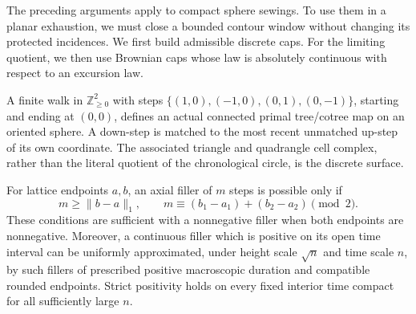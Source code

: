 The preceding arguments apply to compact sphere sewings. To use them
in a planar exhaustion, we must close a bounded contour window without
changing its protected incidences. We first build admissible discrete
caps. For the limiting quotient, we then use Brownian caps whose law
is absolutely continuous with respect to an excursion law.

\begin{lemma}
\label{bg:axial-completion}
A finite walk in $\mathbb Z_{\ge0}^2$ with steps
$\{(1,0),(-1,0),(0,1),(0,-1)\}$, starting and ending at $(0,0)$,
defines an actual connected primal tree/cotree map on an oriented
sphere. A down-step is matched to the most recent unmatched up-step
of its own coordinate. The associated triangle and quadrangle cell
complex, rather than the literal quotient of the chronological
circle, is the discrete surface.

For lattice endpoints $a,b$, an axial filler of $m$ steps is possible
only if
\[
 m\ge \lVert b-a\rVert_1,
 \qquad m\equiv(b_1-a_1)+(b_2-a_2)\pmod 2.
\]
These conditions are sufficient with a nonnegative filler when both
endpoints are nonnegative. Moreover, a continuous filler which is
positive on its open time interval can be uniformly approximated,
under height scale $\sqrt n$ and time scale $n$, by such fillers of
prescribed positive macroscopic duration and compatible rounded
endpoints. Strict positivity holds on every fixed interior time
compact for all sufficiently large $n$.
\end{lemma}

